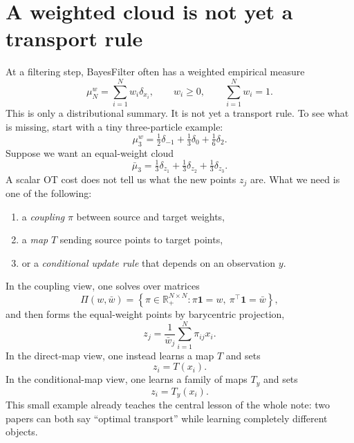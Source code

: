 \documentclass[11pt]{report}
\newcommand{\R}{\mathbb{R}}
\begin{document}
\section{A weighted cloud is not yet a transport rule}

At a filtering step, BayesFilter often has a weighted empirical measure
\begin{equation}
\mu_N^w = \sum_{i=1}^{N} w_i\delta_{x_i},
\qquad
w_i\ge 0,
\qquad
\sum_{i=1}^{N} w_i=1.
\label{eq:weighted-cloud}
\end{equation}
This is only a distributional summary.  It is not yet a transport rule.  To see
what is missing, start with a tiny three-particle example:
\begin{equation}
\mu_3^w = \tfrac12 \delta_{-1} + \tfrac13 \delta_{0} + \tfrac16 \delta_{2}.
\label{eq:three-particle-source}
\end{equation}
Suppose we want an equal-weight cloud
\begin{equation}
\bar\mu_3 = \tfrac13 \delta_{z_1} + \tfrac13 \delta_{z_2} + \tfrac13 \delta_{z_3}.
\label{eq:three-particle-target}
\end{equation}
A scalar OT cost does not tell us what the new points $z_j$ are.  What we need is
one of the following:
\begin{enumerate}[label=(\roman*)]
  \item a \emph{coupling} $\pi$ between source and target weights,
  \item a \emph{map} $T$ sending source points to target points,
  \item or a \emph{conditional update rule} that depends on an observation $y$.
\end{enumerate}

In the coupling view, one solves over matrices
\begin{equation}
\Pi(w,\bar w)
=
\left\{
\pi\in\R_+^{N\times N}:
\pi\mathbf 1 = w,
\ \pi^{\top}\mathbf 1 = \bar w
\right\},
\label{eq:transport-polytope}
\end{equation}
and then forms the equal-weight points by barycentric projection,
\begin{equation}
z_j = \frac{1}{\bar w_j}\sum_{i=1}^{N} \pi_{ij}x_i.
\label{eq:barycentric-projection}
\end{equation}
In the direct-map view, one instead learns a map $T$ and sets
\begin{equation}
z_i = T(x_i).
\label{eq:direct-map-deployment}
\end{equation}
In the conditional-map view, one learns a family of maps $T_y$ and sets
\begin{equation}
z_i = T_y(x_i).
\label{eq:conditional-map-deployment}
\end{equation}
This small example already teaches the central lesson of the whole note: two
papers can both say ``optimal transport'' while learning completely different
objects.
\end{document}
